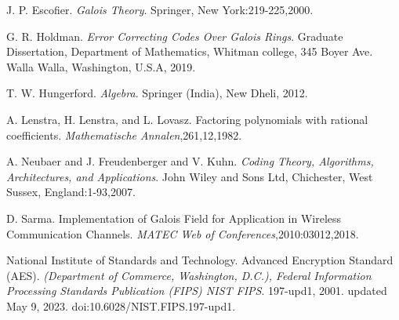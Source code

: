 
\begin{thebibliography}{9}

J. P. Escofier. \emph{Galois Theory}. Springer, New York:219-225,2000.

G. R. Holdman. \emph{Error Correcting Codes  Over Galois Rings}. Graduate Dissertation, Department of Mathematics, Whitman college, 345 Boyer Ave.
Walla Walla, Washington, U.S.A, 2019.

T. W. Hungerford. \emph{Algebra}. Springer (India), New Dheli, 2012.

A. Lenstra, H. Lenstra, and L. Lovasz. Factoring polynomials with rational coefficients. \emph{Mathematische Annalen},261,12,1982.

A. Neubaer and J. Freudenberger and V. Kuhn. \emph{Coding Theory, Algorithms, Architectures, and Applications}. John Wiley and Sons Ltd, Chichester, West Sussex, England:1-93,2007.

D. Sarma. Implementation of Galois Field for Application in Wireless Communication Channels. \emph{MATEC Web of Conferences},2010:03012,2018.

National Institute of Standards and Technology. Advanced Encryption
Standard (AES). \emph{(Department of Commerce, Washington, D.C.), Federal Information Processing Standards Publication (FIPS) NIST FIPS}. 197-upd1, 2001. updated May 9, 2023. doi:10.6028/NIST.FIPS.197-upd1.
\end{thebibliography}
